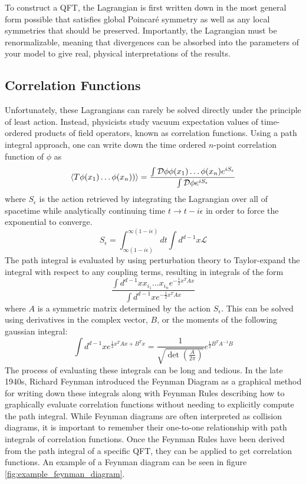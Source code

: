 To construct a QFT, the Lagrangian is first written down in the most general form possible that satisfies global Poincaré symmetry as well as any local symmetries that should be preserved. Importantly, the Lagrangian must be renormalizable, meaning that divergences can be absorbed into the parameters of your model to give real, physical interpretations of the results.

\subsection{Correlation Functions}

Unfortunately, these Lagrangians can rarely be solved directly under the principle of least action. Instead, physicists study vacuum expectation values of time-ordered products of field operators, known as correlation functions. Using a path integral approach, one can write down the time ordered $n$-point correlation function of $\phi$ as
\begin{equation}
\braket{T \phi(x_{1}) \dots  \phi({x_{n}}))} = \frac{\int \mathcal{D}\phi \phi(x_{1}) \dots  \phi({x_{n}}) e^{iS_{\epsilon}}}{\int \mathcal{D}\phi e^{iS_{\epsilon}}}
\end{equation}
where $S_\epsilon$ is the action retrieved by integrating the Lagrangian over all of spacetime while analytically continuing time $t \to t - i\epsilon$ in order to force the exponential to converge. 
\begin{equation}
S_{\epsilon} = \int^{\infty(1-i\epsilon)}_{\infty(1-i\epsilon)} dt \int d^{d-1} x \mathcal{L}
\end{equation}
The path integral is evaluated by using perturbation theory to Taylor-expand the integral with respect to any coupling terms, resulting in integrals of the form 
\begin{equation}
\frac{\int d^{d-1}x x_{i_{1}}\dots x_{i_{n}} e^{-\frac{1}{2}x^TAx}}{\int d^{d-1}x  e^{-\frac{1}{2}x^TAx}}
\end{equation}
where $A$ is a symmetric matrix determined by the action $S_\epsilon$. This can be solved using derivatives in the complex vector, $B$, or the moments of the following gaussian integral:
\begin{equation}
\int d^{d-1} x e^{\frac{1}{2}x^TAx + B^Tx} = \frac{1}{\sqrt{ \det\left( \frac{A}{2\pi}\right) } } e^{\frac{1}{2}B^T A^{-1} B}
\end{equation}
The process of evaluating these integrals can be long and tedious. In the late 1940s, Richard Feynman introduced the Feynman Diagram as a graphical method for writing down these integrals along with Feynman Rules describing how to graphically evaluate correlation functions without needing to explicitly compute the path integral. While Feynman diagrams are often interpreted as collision diagrams, it is important to remember their one-to-one relationship with path integrals of correlation functions. Once the Feynman Rules have been derived from the path integral of a specific QFT, they can be applied to get correlation functions. An example of a Feynman diagram can be seen in figure \ref{fig:example_feynman_diagram}.

